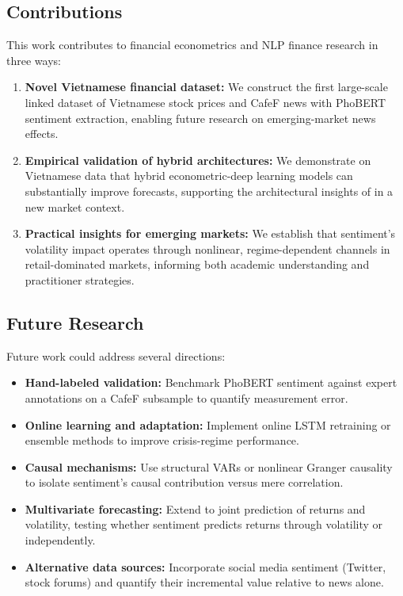 \subsection*{Contributions}

This work contributes to financial econometrics and NLP finance research in three ways:

\begin{enumerate}
    \item \textbf{Novel Vietnamese financial dataset:} We construct the first large-scale linked dataset of Vietnamese stock prices and CafeF news with PhoBERT sentiment extraction, enabling future research on emerging-market news effects.
    
    \item \textbf{Empirical validation of hybrid architectures:} We demonstrate on Vietnamese data that hybrid econometric-deep learning models can substantially improve forecasts, supporting the architectural insights of \citet{leber2025nonlinear} in a new market context.
    
    \item \textbf{Practical insights for emerging markets:} We establish that sentiment's volatility impact operates through nonlinear, regime-dependent channels in retail-dominated markets, informing both academic understanding and practitioner strategies.
\end{enumerate}

\subsection*{Future Research}

Future work could address several directions:

\begin{itemize}
    \item \textbf{Hand-labeled validation:} Benchmark PhoBERT sentiment against expert annotations on a CafeF subsample to quantify measurement error.
    \item \textbf{Online learning and adaptation:} Implement online LSTM retraining or ensemble methods to improve crisis-regime performance.
    \item \textbf{Causal mechanisms:} Use structural VARs or nonlinear Granger causality to isolate sentiment's causal contribution versus mere correlation.
    \item \textbf{Multivariate forecasting:} Extend to joint prediction of returns and volatility, testing whether sentiment predicts returns through volatility or independently.
    \item \textbf{Alternative data sources:} Incorporate social media sentiment (Twitter, stock forums) and quantify their incremental value relative to news alone.
\end{itemize}
